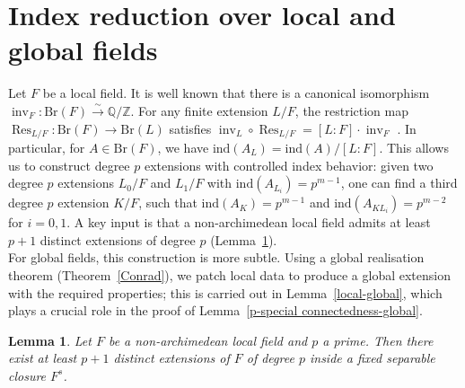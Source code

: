 \documentclass[10pt]{amsart}
\theoremstyle{plain}
\newtheorem{lemma}[thm]{Lemma}
\theoremstyle{definition}
\newcommand{\Br}{\text{Br}}
\begin{document}
\section{Index reduction over local and global fields}\label{Index reduction over local and global fields}
Let \(F\) be a local field. It is well known that there is a canonical isomorphism \(\operatorname{inv}_F \colon \Br(F) \xrightarrow{\sim} \mathbb{Q}/\mathbb{Z}\). For any finite extension \(L/F\), the restriction map \(\operatorname{Res}_{L/F} \colon \Br(F) \to \Br(L)\) satisfies \(\operatorname{inv}_L \circ \operatorname{Res}_{L/F} = [L:F] \cdot\operatorname{inv}_F\) \cite[Chapter 13, Proposition 7]{serre2013local}. In particular, for \(A \in \Br(F)\), we have \(\mathrm{ind}(A_L)=\mathrm{ind}(A)/[L:F]\). This allows us to construct degree \(p\) extensions with controlled index behavior: given two degree \(p\) extensions \(L_0/F\) and \(L_1/F\) with \(\mathrm{ind}(A_{L_i})=p^{m-1}\), one can find a third degree \(p\) extension \(K/F\), such that \(\mathrm{ind}(A_K)=p^{m-1}\) and \(\mathrm{ind}(A_{KL_i})=p^{m-2}\) for \(i=0,1\). A key input is that a non-archimedean local field admits at least \(p+1\) distinct extensions of degree \(p\) (Lemma~\ref{atleast 3 distinct deg p}). \\
For global fields, this construction is more subtle. Using a global realisation theorem (Theorem~\ref{Conrad}), we patch local data to produce a global extension with the required properties; this is carried out in Lemma~\ref{local-global}, which plays a crucial role in the proof of Lemma~\ref{p-special connectedness-global}.
\begin{lemma} \label{atleast 3 distinct deg p}
Let \(F\) be a non-archimedean local field and \(p\) a prime. Then there exist at least \(p+1\) distinct extensions of \(F\) of degree \(p\) inside a fixed separable closure \(F^s\). 
\end{lemma}
\end{document}
